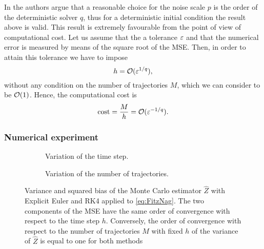 \begin{remark} In \cite{CGS16} the authors argue that a reasonable choice for the noise scale $p$ is the order of the deterministic solver $q$, thus for a deterministic initial condition the result above is valid. This result is extremely favourable from the point of view of computational cost. Let us assume that the a tolerance $\varepsilon$ and that the numerical error is measured by means of the square root of the MSE. Then, in order to attain this tolerance we have to impose
\begin{equation}
	h = \mathcal{O}(\varepsilon^{1/q}),
\end{equation}
without any condition on the number of trajectories $M$, which we can consider to be $\mathcal{O}(1)$. Hence, the computational cost is 
\begin{equation}
	\mathrm{cost} = \frac{M}{h} = \mathcal{O}(\varepsilon^{-1/q}).
\end{equation}
\end{remark}

\subsubsection{Numerical experiment}

\begin{figure}
\centering
\begin{subfigure}{0.49\linewidth}
	\centering
	\resizebox{1.0\linewidth}{!}{}
	\caption{Variation of the time step.}
	\label{fig:MonteCarloVarianceH}
\end{subfigure}
\begin{subfigure}{0.49\linewidth}
	\centering
	\resizebox{1.0\linewidth}{!}{}
	\caption{Variation of the number of trajectories.}
	\label{fig:MonteCarloVarianceM}
\end{subfigure}
\caption{Variance and squared bias of the Monte Carlo estimator $\hat Z$ with Explicit Euler and RK4 applied to \eqref{eq:FitzNag}. The two components of the MSE have the same order of convergence with respect to the time step $h$. Conversely, the order of convergence with respect to the number of trajectories $M$ with fixed $h$ of the variance of $\hat Z$ is equal to one for both methods}
\label{fig:MonteCarloVariance}
\end{figure}


